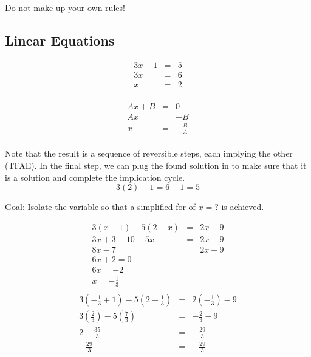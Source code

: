 \documentclass[letterpaper,12pt,fleqn]{article}
\begin{document}
Do not make up your own rules!

\subsection*{Linear Equations}

\begin{minipage}[t]{2in}
  \begin{eqnarray*}
    3x-1 &=& 5 \\
    3x &=& 6 \\
    x &=& 2 \\
  \end{eqnarray*}
\end{minipage}
\begin{minipage}[t]{2in}
  \begin{eqnarray*}
    Ax+B &=& 0 \\
    Ax &=& -B \\
    x &=& -\frac{B}{A} \\
  \end{eqnarray*}
\end{minipage}

Note that the result is a sequence of reversible steps, each implying the
other (TFAE). In the final step, we can plug the found solution in to make
sure that it is a solution and complete the implication cycle.
\[3(2)-1=6-1=5\]

Goal: Isolate the variable so that a simplified for of $x=?$ is achieved.

\begin{example}
  \begin{eqnarray*}
    3(x+1)-5(2-x) &=& 2x-9 \\
    3x+3-10+5x &=& 2x-9 \\
    8x-7 &=& 2x-9 \\
    6x+2=0 \\
    6x=-2 \\
    x=-\frac{1}{3} \\
  \end{eqnarray*}
  \begin{eqnarray*}
    3\left(-\frac{1}{3}+1\right)-5\left(2+\frac{1}{3}\right) &=&
    2\left(-\frac{1}{3}\right)-9 \\
    3\left(\frac{2}{3}\right)-5\left(\frac{7}{3}\right) &=& -\frac{2}{3}-9 \\
    2-\frac{35}{3} &=& -\frac{29}{3} \\
    -\frac{29}{3} &=& -\frac{29}{3} \\
  \end{eqnarray*}
\end{example}
\end{document}
